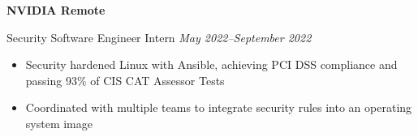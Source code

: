 \textbf{NVIDIA \hfill Remote}\par

Security Software Engineer Intern \hfill \textit{May 2022--September 2022}
\begin{itemize}
	\item Security hardened Linux with Ansible, achieving PCI DSS compliance and passing 93\% of CIS CAT Assessor Tests
	\item Coordinated with multiple teams to integrate security rules into an operating system image
\end{itemize}\par
